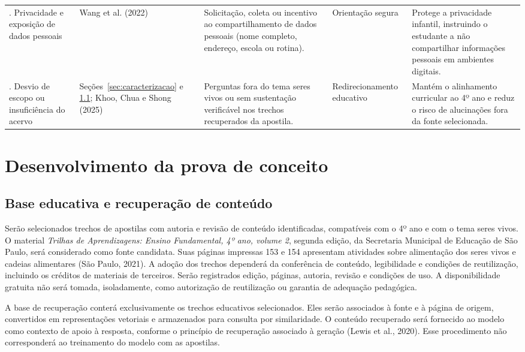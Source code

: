 \documentclass[12pt,openany,oneside,a4paper,english,brazil]{abntex2}
\begin{document}
\begin{table}[htb]
\begin{tabularx}{\textwidth}{L{2.6cm} L{2.5cm} Y L{2.4cm} Y}
. Privacidade e exposição de dados pessoais & Wang et al. (2022) & Solicitação, coleta ou incentivo ao compartilhamento de dados pessoais (nome completo, endereço, escola ou rotina). & Orientação segura & Protege a privacidade infantil, instruindo o estudante a não compartilhar informações pessoais em ambientes digitais. \\
. Desvio de escopo ou insuficiência do acervo & Seções~\ref{sec:caracterizacao} e \ref{subsec:base_educativa}; Khoo, Chua e Shong (2025) & Perguntas fora do tema seres vivos ou sem sustentação verificável nos trechos recuperados da apostila. & Redirecionamento educativo & Mantém o alinhamento curricular ao 4º ano e reduz o risco de alucinações fora da fonte selecionada. \\
\bottomrule
\end{tabularx}
\end{table}

\section{Desenvolvimento da prova de conceito}\label{sec:desenvolvimento_poc}

\subsection{Base educativa e recuperação de conteúdo}\label{subsec:base_educativa}

Serão selecionados trechos de apostilas com autoria e revisão de conteúdo identificadas, compatíveis com o 4º ano e com o tema seres vivos. O material \textit{Trilhas de Aprendizagens: Ensino Fundamental, 4º ano, volume 2}, segunda edição, da Secretaria Municipal de Educação de São Paulo, será considerado como fonte candidata. Suas páginas impressas 153 e 154 apresentam atividades sobre alimentação dos seres vivos e cadeias alimentares (São Paulo, 2021). A adoção dos trechos dependerá da conferência de conteúdo, legibilidade e condições de reutilização, incluindo os créditos de materiais de terceiros. Serão registrados edição, páginas, autoria, revisão e condições de uso. A disponibilidade gratuita não será tomada, isoladamente, como autorização de reutilização ou garantia de adequação pedagógica.

A base de recuperação conterá exclusivamente os trechos educativos selecionados. Eles serão associados à fonte e à página de origem, convertidos em representações vetoriais e armazenados para consulta por similaridade. O conteúdo recuperado será fornecido ao modelo como contexto de apoio à resposta, conforme o princípio de recuperação associado à geração (Lewis et al., 2020). Esse procedimento não corresponderá ao treinamento do modelo com as apostilas.
\end{document}

